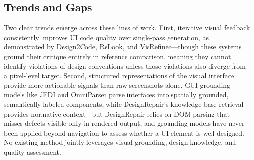 \documentclass[11pt]{article}
\begin{document}
\subsection{Trends and Gaps}

Two clear trends emerge across these lines of work. First, iterative visual feedback consistently improves UI code quality over single-pass generation, as demonstrated by Design2Code, ReLook, and VisRefiner—though these systems ground their critique entirely in reference comparison, meaning they cannot identify violations of design conventions unless those violations also diverge from a pixel-level target. Second, structured representations of the visual interface provide more actionable signals than raw screenshots alone. GUI grounding models like JEDI and OmniParser parse interfaces into spatially grounded, semantically labeled components, while DesignRepair's knowledge-base retrieval provides normative context—but DesignRepair relies on DOM parsing that misses defects visible only in rendered output, and grounding models have never been applied beyond navigation to assess whether a UI element is well-designed.
No existing method jointly leverages visual grounding, design knowledge, and quality assessment. 



\end{document}
